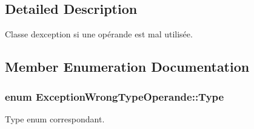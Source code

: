 \subsection{Detailed Description}
Classe d\textquotesingle{}exception si une opérande est mal utilisée. 

\subsection{Member Enumeration Documentation}
\subsubsection[{\texorpdfstring{Type}{Type}}]{\setlength{\rightskip}{0pt plus 5cm}enum {\bf Exception\+Wrong\+Type\+Operande\+::\+Type}}\hypertarget{class_exception_wrong_type_operande_a1a1fb938febe831c80823eca12a76bd4}{}\label{class_exception_wrong_type_operande_a1a1fb938febe831c80823eca12a76bd4}


Type enum correspondant. 

